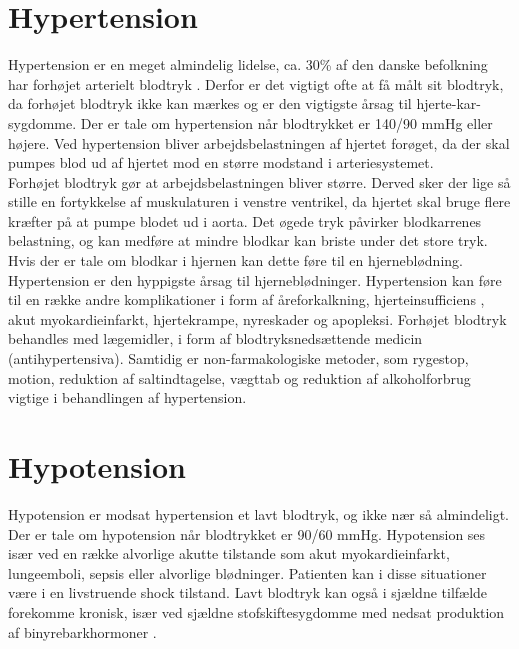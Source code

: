 \section{Hypertension} 
Hypertension er en meget almindelig lidelse, ca. 30\% af den danske befolkning har forhøjet arterielt blodtryk \cite{Hypertension}. Derfor er det vigtigt ofte at få målt sit blodtryk, da forhøjet blodtryk ikke kan mærkes og er den vigtigste årsag til hjerte-kar-sygdomme. 
Der er tale om hypertension når blodtrykket er 140/90 mmHg eller højere.
Ved hypertension bliver arbejdsbelastningen af hjertet forøget, da der skal pumpes blod ud af hjertet mod en større modstand i arteriesystemet. \\
Forhøjet blodtryk gør at arbejdsbelastningen bliver større. Derved sker der lige så stille en fortykkelse af muskulaturen i venstre ventrikel, da hjertet skal bruge flere kræfter på at pumpe blodet ud i aorta. 
Det øgede tryk påvirker blodkarrenes belastning, og kan medføre at mindre blodkar kan briste under det store tryk. Hvis der er tale om blodkar i hjernen kan dette føre til en hjerneblødning. Hypertension er den hyppigste årsag til hjerneblødninger.
Hypertension kan føre til en række andre komplikationer i form af åreforkalkning, hjerteinsufficiens \cite{Hjerteinsufficiens}, akut myokardieinfarkt, hjertekrampe, nyreskader og apopleksi.
Forhøjet blodtryk behandles med lægemidler, i form af blodtryksnedsættende medicin (antihypertensiva). Samtidig er non-farmakologiske metoder, som rygestop, motion, reduktion af saltindtagelse, vægttab og reduktion af alkoholforbrug vigtige i behandlingen af hypertension. 

\section{Hypotension} 
Hypotension er modsat hypertension et lavt blodtryk, og ikke nær så almindeligt. Der er tale om hypotension når blodtrykket er 90/60 mmHg. Hypotension ses især ved en række alvorlige akutte tilstande som akut myokardieinfarkt, lungeemboli, sepsis eller alvorlige blødninger. Patienten kan i disse situationer være i en livstruende shock tilstand. Lavt blodtryk kan også i sjældne tilfælde forekomme kronisk, især ved sjældne stofskiftesygdomme med nedsat produktion af binyrebarkhormoner \nocite{Hypotension}.   